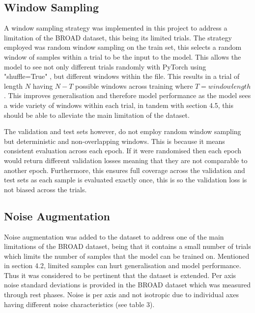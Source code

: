 \subsection{Window Sampling}
A window sampling strategy was implemented in this project to address a limitation of the BROAD dataset, this 
being its limited trials. The strategy employed was random window sampling on the train set, this selects a random window of samples within
a trial to be the input to the model. This allows the model to see not only different trials randomly with PyTorch using 
"shuffle=True" \cite{pytorchcontributors_2023_pytorch}, but different windows within the file. This results in a trial of length $N$ having $N - T$ possible 
windows across training where $T = window length$.
This improves generalisation and therefore model performance
as the model sees a wide variety of windows within each trial, in tandem with  section 4.5, this should be able to 
alleviate the main limitation of the dataset. 

The validation and test sets however, do not employ random window sampling but deterministic and non-overlapping windows. This 
is because it means consistent evaluation across each epoch. If it were randomised then each epoch would return different validation
losses meaning that they are not comparable to another epoch. Furthermore, this ensures full coverage across the validation and test 
sets as each sample is evaluated exactly once, this is so the validation loss is not biased across the trials.



\subsection{Noise Augmentation}
Noise augmentation was added to the dataset to address one of the main limitations of the BROAD dataset, being that it contains a 
small number of trials which limits the number of samples that the model can be trained on. Mentioned in section 4.2, limited
samples can hurt generalisation and model performance. Thus it was considered to be pertinent that the dataset is extended. Per axis
noise standard deviations is provided in the BROAD dataset \cite{laidig_2021_broada} which was measured through rest phases. Noise 
is per axis and not isotropic due to individual axes having different noise characteristics (see table 3).

